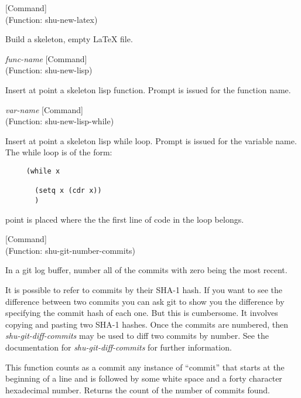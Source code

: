 \vspace{1em}
\noindent
{}
\usebox{\funcname}
 \hfill [Command]\\%
 (Function: shu-new-latex)

\begin{doc-string}
Build a skeleton, empty LaTeX file.
\end{doc-string}

\vspace{1em}
\noindent
{}
\usebox{\funcname}\emph{func-name}
 \hfill [Command]\\%
 (Function: shu-new-lisp)

\begin{doc-string}
Insert at point a skeleton lisp function.  Prompt is issued for the function
name.
\end{doc-string}

\vspace{1em}
\noindent
{}
\usebox{\funcname}\emph{var-name}
 \hfill [Command]\\%
 (Function: shu-new-lisp-while)

\begin{doc-string}
Insert at point a skeleton lisp while loop.  Prompt is issued for the
variable name.  The while loop is of the form:

\small{\begin{verbatim}
     (while x

       (setq x (cdr x))
       )
\end{verbatim}}
point is placed where the the first line of code in the loop belongs.
\end{doc-string}

\vspace{1em}
\noindent
{}
\usebox{\funcname}
 \hfill [Command]\\%
 (Function: shu-git-number-commits)

\begin{doc-string}
In a git log buffer, number all of the commits with zero being the most
recent.

It is possible to refer to commits by their SHA-1 hash.  If you want to see the
difference between two commits you can ask git to show you the difference by
specifying the commit hash of each one.  But this is cumbersome.  It involves
copying and pasting two SHA-1 hashes.  Once the commits are numbered, then
\emph{shu-git-diff-commits} may be used to diff two commits by number.  See the
documentation for \emph{shu-git-diff-commits} for further information.

This function counts as a commit any instance of ``commit'' that starts at the
beginning of a line and is followed by some white space and a forty character
hexadecimal number.  Returns the count of the number of commits found.
\end{doc-string}

